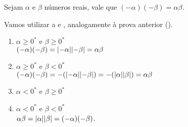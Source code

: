 \documentclass[../main.tex]{subfiles}
\begin{document}
\begin{prop}\label{reais-prop-regraSinaisProduto2}
    Sejam $\alpha$ e $\beta$ números reais, vale que $\left( -\alpha \right) \left( -\beta \right) = \alpha \beta$.
\end{prop}
\begin{dem}
    Vamos utilizar a  e , analogamente à prova anterior ().
    \begin{enumerate}
        \item $\alpha \geq 0^*$ e $\beta \geq 0^*$ \\
            $(-\alpha)(-\beta) = \abs{-\alpha}\abs{-\beta} = \alpha\beta$
        
        \item $\alpha \geq 0^*$ e $\beta < 0^*$ \\
            $(-\alpha)(-\beta) = -(\abs{-\alpha}\abs{-\beta}) = -(\abs{\alpha}\abs{\beta}) = \alpha\beta $
        \item $\alpha < 0^*$ e $\beta \geq 0^*$ \\
         
        \item $\alpha < 0^*$ e $\beta < 0^*$ \\
            $\alpha\beta = \abs{\alpha}\abs{\beta} = (-\alpha)(-\beta)$.
    \end{enumerate}
\end{dem}
\end{document}
